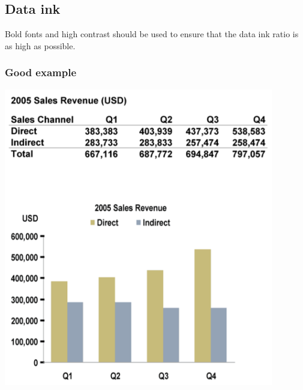 \documentclass[11pt]{article}
\begin{document}
 \newpage
\subsection{Data ink}
\label{sec:org68e0290}
Bold fonts and high contrast should be used to ensure that the data ink ratio is as high as possible.
\subsubsection{Good example}
\label{sec:org322fc2e}
\begin{center}
\includegraphics[width=.9\linewidth]{./images/data-ink-example.png}
\end{center}
\end{document}
